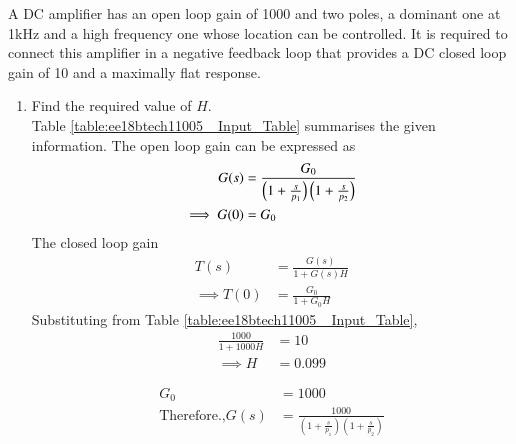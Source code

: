 
A DC amplifier has an open loop gain of 1000 and two poles, a dominant one at 1kHz and a high frequency one whose location can be controlled. It is required to connect this amplifier in a negative feedback loop that provides a DC closed loop gain of 10 and a maximally flat response. 

\begin{enumerate}[label=\arabic*.,ref=\theenumi]

\item Find the required value of $H$.
\\
\solution Table \ref{table:ee18btech11005_ Input_Table} summarises the given information.  The open loop gain can be expressed as
\begin{align}
\label{eq:ee18btech11005_ee18btech11005_open_loop_gain} 
  G(s) &= \frac{G_0}{\left(1+\frac{s}{p_{1}}\right)\left(1+\frac{s}{p_{2}}\right)} 
\\
\implies G(0) &= G_0
\end{align}
The closed loop gain 
\begin{align}
 \label{eq:ee18btech11005_ee18btech11005_transfer_function}
    T(s) &= \frac{G(s)}{1+G(s)H}
\\
\implies T(0) &= \frac{G_0}{1+G_0H}
\end{align}
%
Substituting from Table \ref{table:ee18btech11005_ Input_Table}, 
\begin{align}
\frac{1000}{1+1000H} &= 10
\\
\implies H &=  0.099 
\label{eq:ee18btech11005_ee18btech11005_h_value}
\end{align}
%
\begin{table}[!ht]
\centering

\caption{}
\label{table:ee18btech11005_ Input_Table}
\end{table}
\begin{align}
    G_0 &= 1000\\
\text{Therefore.,} G(s)&= \frac{1000}{(1+\frac{s}{p_{1}})(1+\frac{s}{p_{2}})}  
\end{align}

\end{enumerate}
